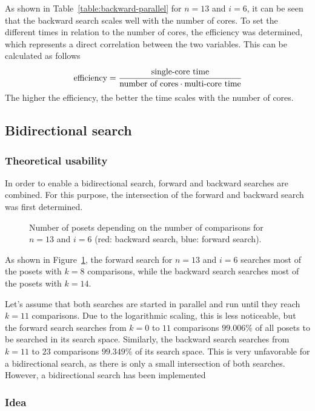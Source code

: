 \documentclass[10pt,journal,compsoc]{IEEEtran}
\begin{document}
As shown in Table~\ref{table:backward-parallel} for $n = 13$ and $i = 6$, it can be seen that the backward search scales well with the number of cores.
To set the different times in relation to the number of cores, the efficiency was determined, which represents a direct correlation between the two variables.
This can be calculated as follows
\[
  \text{efficiency} = \cfrac{\text{single-core time}}{\text{number of cores} \cdot \text{multi-core time}}
\]
The higher the efficiency, the better the time scales with the number of cores.


\subsection{Bidirectional search} \label{sec:bidirectional}

\subsubsection{Theoretical usability}

In order to enable a bidirectional search, forward and backward searches are combined.
For this purpose, the intersection of the forward and backward search was first determined.

\begin{figure}[!b]
  \centering
  
  \caption{Number of posets depending on the number of comparisons for $n = 13$ and $i = 6$ (red: backward search, blue: forward search).}
  \label{fig:backward_forward_count_13_6}
\end{figure}

As shown in Figure~\ref{fig:backward_forward_count_13_6}, the forward search for $n = 13$ and $i = 6$ searches most of the posets with $k = 8$ comparisons, while the backward search searches most of the posets with $k = 14$.

Let's assume that both searches are started in parallel and run until they reach $k = 11$ comparisons.
Due to the logarithmic scaling, this is less noticeable, but the forward search searches from $k = 0$ to $11$ comparisons $99.006\%$ of all posets to be searched in its search space.
Similarly, the backward search searches from $k = 11$ to $23$ comparisons $99.349\%$ of its search space.
This is very unfavorable for a bidirectional search, as there is only a small intersection of both searches.
However, a bidirectional search has been implemented

\subsubsection{Idea}
\end{document}
